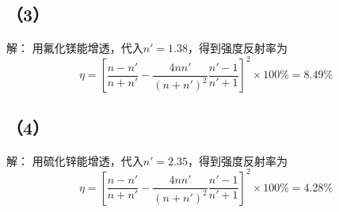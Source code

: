 \documentclass[10pt,a4paper]{article}
\begin{document}
\subsection*{（3）}解：
用氟化镁能增透，代入$n' = 1.38$，得到强度反射率为
\[
\eta = [\frac{n - n'}{n + n'} - \frac{4nn'}{(n + n')^2}\frac{n' - 1}{n' + 1}]^2\times100\% = 8.49\%
\]
\subsection*{（4）}解：
用硫化锌能增透，代入$n' = 2.35$，得到强度反射率为
\[
\eta = [\frac{n - n'}{n + n'} - \frac{4nn'}{(n + n')^2}\frac{n' - 1}{n' + 1}]^2\times100\% = 4.28\%
\]
\end{document}
